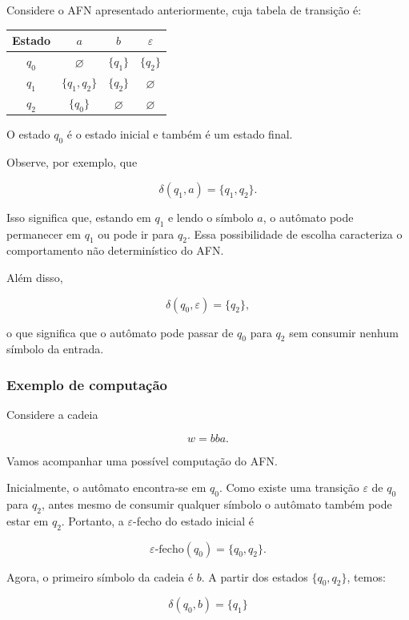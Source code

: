 \documentclass[
  brazilian,
  letterpaper,
]{book}
\theoremstyle{plain}
\theoremstyle{definition}
\theoremstyle{remark}
\begin{document}
Considere o AFN apresentado anteriormente, cuja tabela de transição é:

\begin{longtable*}[]{|c|c|c|c|}
\toprule\noalign{}
Estado & \(a\) & \(b\) & \(\varepsilon\) \\
\midrule\noalign{}
\endhead
\bottomrule\noalign{}
\endlastfoot
\(q_0\) & \(\varnothing\) & \(\{q_1\}\) & \(\{q_2\}\) \\
\midrule
\(q_1\) & \(\{q_1,q_2\}\) & \(\{q_2\}\) & \(\varnothing\) \\
\midrule
\(q_2\) & \(\{q_0\}\) & \(\varnothing\) & \(\varnothing\) \\
\end{longtable*}

O estado \(q_0\) é o estado inicial e também é um estado final.

Observe, por exemplo, que

\[
\delta(q_1,a)=\{q_1,q_2\}.
\]

Isso significa que, estando em \(q_1\) e lendo o símbolo \(a\), o
autômato pode permanecer em \(q_1\) ou pode ir para \(q_2\). Essa
possibilidade de escolha caracteriza o comportamento não determinístico
do AFN.

Além disso,

\[
\delta(q_0,\varepsilon)=\{q_2\},
\]

o que significa que o autômato pode passar de \(q_0\) para \(q_2\) sem
consumir nenhum símbolo da entrada.

\subsubsection{Exemplo de computação}\label{exemplo-de-computauxe7uxe3o}

Considere a cadeia

\[
w=bba.
\]

Vamos acompanhar uma possível computação do AFN.

Inicialmente, o autômato encontra-se em \(q_0\). Como existe uma
transição \(\varepsilon\) de \(q_0\) para \(q_2\), antes mesmo de
consumir qualquer símbolo o autômato também pode estar em \(q_2\).
Portanto, a \(\varepsilon\)-fecho do estado inicial é

\[
\varepsilon\text{-fecho}(q_0)=\{q_0,q_2\}.
\]

Agora, o primeiro símbolo da cadeia é \(b\). A partir dos estados
\(\{q_0,q_2\}\), temos:

\[
\delta(q_0,b)=\{q_1\}
\]
\end{document}
